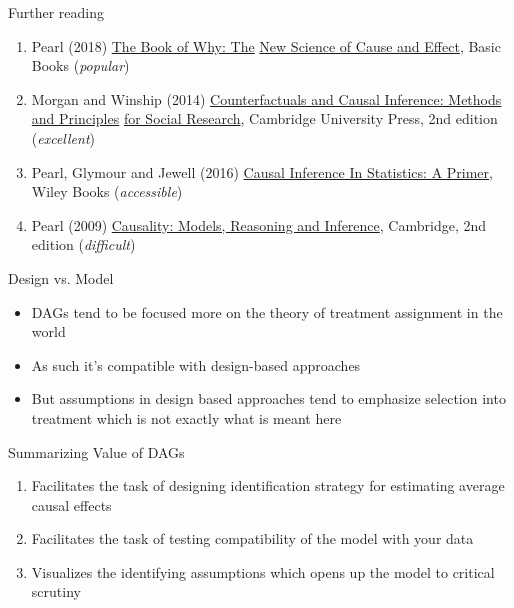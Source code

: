 \documentclass{beamer}
\begin{document}
\begin{frame}{Further reading}

  \begin{enumerate}

    \item Pearl (2018) \underline{The Book of Why: The} \underline{New Science of Cause and Effect}, Basic Books (\emph{popular})
    \item Morgan and Winship (2014) \underline{Counterfactuals and Causal Inference: Methods and Principles} \underline{for Social Research}, Cambridge University Press, 2nd edition (\emph{excellent})
    \item Pearl, Glymour and Jewell (2016) \underline{Causal Inference In Statistics: A Primer}, Wiley Books (\emph{accessible})
    \item Pearl (2009) \underline{Causality: Models, Reasoning and Inference}, Cambridge, 2nd edition (\emph{difficult})
  \end{enumerate}

\end{frame}

\begin{frame}{Design vs. Model}

  \begin{itemize}
    \item DAGs tend to be focused more on the theory of treatment assignment in the world
    \item As such it's compatible with design-based approaches
    \item But assumptions in design based approaches tend to emphasize selection into treatment which is not exactly what is meant here
  \end{itemize}

\end{frame}

\begin{frame}{Summarizing Value of DAGs}

  \begin{enumerate}
    \item Facilitates the task of designing identification strategy for estimating average causal effects
    \item Facilitates the task of testing compatibility of the model with your data
    \item Visualizes the identifying assumptions which opens up the model to critical scrutiny
  \end{enumerate}

\end{frame}
\end{document}
